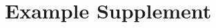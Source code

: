 \documentclass[hidelinks,a4paper,11pt,openany]{article}
\newcommand{\supplementName}{Example Supplement}
\begin{document}
\section*{\supplementName}






\end{document}
